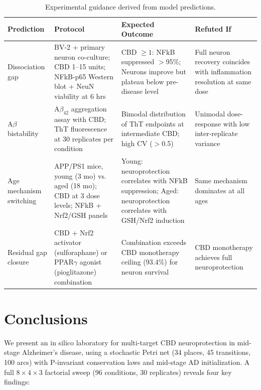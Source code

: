 \documentclass[10pt,letterpaper]{article}
\begin{document}
\begin{table}[htbp]
\centering
\caption{Experimental guidance derived from model predictions.}
\label{tab:experimental_guidance}
\begin{tabular}{p{2.2cm}p{3cm}p{3cm}p{3cm}}
\toprule
\textbf{Prediction} & \textbf{Protocol} & \textbf{Expected Outcome} & \textbf{Refuted If} \\
\midrule
Dissociation gap &
BV-2 + primary neuron co-culture; CBD 1--15 units; NFkB-p65 Western blot + NeuN viability at 6 hrs &
CBD $\geq 1$: NFkB suppressed $>$95\%; Neurons improve but plateau below pre-disease level &
Full neuron recovery coincides with inflammation resolution at same dose \\
\midrule
A$\beta$ bistability &
A$\beta_{42}$ aggregation assay with CBD; ThT fluorescence at 30 replicates per condition &
Bimodal distribution of ThT endpoints at intermediate CBD; high CV ($>$0.5) &
Unimodal dose-response with low inter-replicate variance \\
\midrule
Age mechanism switching &
APP/PS1 mice, young (3 mo) vs. aged (18 mo); CBD at 3 dose levels; NFkB + Nrf2/GSH panels &
Young: neuroprotection correlates with NFkB suppression; Aged: neuroprotection correlates with GSH/Nrf2 induction &
Same mechanism dominates at all ages \\
\midrule
Residual gap closure &
CBD + Nrf2 activator (sulforaphane) or PPAR$\gamma$ agonist (pioglitazone) combination &
Combination exceeds CBD monotherapy ceiling (93.4\%) for neuron survival &
CBD monotherapy achieves full neuroprotection \\
\bottomrule
\end{tabular}
\end{table}

\section{Conclusions}

We present an in silico laboratory for multi-target CBD neuroprotection in mid-stage Alzheimer's disease, using a stochastic Petri net (34 places, 45 transitions, 100 arcs) with P-invariant conservation laws and mid-stage AD initialization. A full $8 \times 4 \times 3$ factorial sweep (96 conditions, 30 replicates) reveals four key findings:
\end{document}
